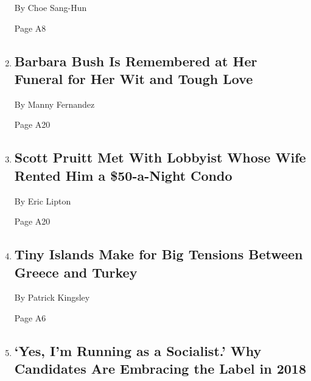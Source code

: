\begin{enumerate}
  By Choe Sang-Hun

  Page A8
\item
  \href{/2018/04/21/us/barbara-bush-funeral.html}{}

  \hypertarget{barbara-bush-is-remembered-at-her-funeral-for-her-wit-and-tough-love}{%
  \subsection{Barbara Bush Is Remembered at Her Funeral for Her Wit and
  Tough
  Love}\label{barbara-bush-is-remembered-at-her-funeral-for-her-wit-and-tough-love}}

  By Manny Fernandez

  Page A20
\item
  \href{/2018/04/21/climate/pruitt-hart-condo-epa-lobbying.html}{}

  \hypertarget{scott-pruitt-met-with-lobbyist-whose-wife-rented-him-a-50-a-night-condo}{%
  \subsection{Scott Pruitt Met With Lobbyist Whose Wife Rented Him a
  \$50-a-Night
  Condo}\label{scott-pruitt-met-with-lobbyist-whose-wife-rented-him-a-50-a-night-condo}}

  By Eric Lipton

  Page A20
\item
  \href{/2018/04/21/world/europe/greece-turkey-islands.html}{}

  \hypertarget{tiny-islands-make-for-big-tensions-between-greece-and-turkey}{%
  \subsection{Tiny Islands Make for Big Tensions Between Greece and
  Turkey}\label{tiny-islands-make-for-big-tensions-between-greece-and-turkey}}

  By Patrick Kingsley

  Page A6
\item
  \href{/2018/04/20/us/dsa-socialism-candidates-midterms.html}{}

  \hypertarget{yes-im-running-as-a-socialist-why-candidates-are-embracing-the-label-in-2018}{%
  \subsection{`Yes, I'm Running as a Socialist.' Why Candidates Are
  Embracing the Label in
  2018}\label{yes-im-running-as-a-socialist-why-candidates-are-embracing-the-label-in-2018}}


\end{enumerate}
